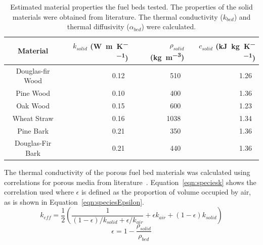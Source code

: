     \begin{table}[hpbt]
        \caption{Estimated material properties the fuel beds tested. The properties of the solid materials were obtained from literature. The thermal conductivity ($k_{bed}$) and thermal diffusivity ($\alpha_{bed}$) were calculated.}
        \centering
        \begin{tabular}{crrr}
            Material &
            $k_{solid}$ (\si{\watt\per\meter\per\kelvin})&
            $\rho_{solid}$ (\si{\kilo\gram\per\cubic\meter}) &
            $c_{solid}$ (\si{\kilo\joule\per\kilogram\per\kelvin})\\
            \hline
            Douglas-fir Wood & 0.12~\cite{Laboratory2010} & 510~\cite{Bean2021}  & 1.26~\cite{Laboratory2010}\\
            Pine Wood        & 0.10~\cite{Laboratory2010} & 400~\cite{Miles2009} & 1.36~\cite{Laboratory2010}\\
            Oak Wood         & 0.15~\cite{Laboratory2010} & 600~\cite{Miles2009} & 1.23~\cite{Laboratory2010}\\
            Wheat Straw      & 0.16~\cite{Mason2016}      & 1038~\cite{Lam2007}  & 1.34~\cite{Stenseng2001}  \\
            Pine Bark        & 0.21~\cite{Gupta2003}      & 350~\cite{Miles2009} & 1.36~\cite{Gupta2003}     \\
            Douglas-Fir Bark & 0.21~\cite{Gupta2003}      & 440~\cite{Miles2009} & 1.36~\cite{Gupta2003}     
        \end{tabular}
        \label{tab:solidProperties}
    \end{table}
    The thermal conductivity of the porous fuel bed materials was calculated using correlations for porous media from literature~\cite{bergman2011fundamentals}. Equation~\ref{eqn:speciesk} shows the correlation used where $\epsilon$ is defined as the proportion of volume occupied by air, as is shown in Equation~\ref{eqn:speciesEpsilon}.
            \begin{equation}
            k_{eff} = \frac{1}{2} \left(\frac{1}{\left( 1 - \epsilon \right)/k_{solid} + \epsilon/k_{air}} +  \epsilon k_{air} + \left(1-\epsilon \right) k_{solid} \right)
            \label{eqn:speciesk}
        \end{equation}
        \begin{equation}
            \epsilon = 1- \frac{\rho_{solid}}{\rho_{bed}}
            \label{eqn:speciesEpsilon}
        \end{equation}
